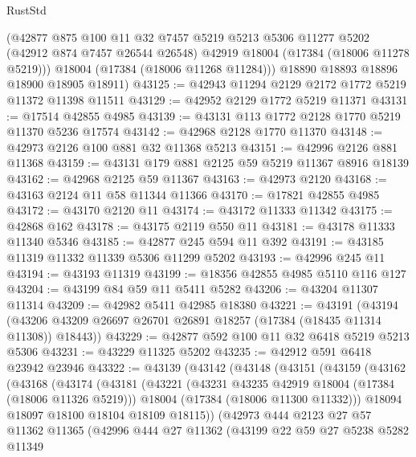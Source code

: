 \begin{lexlean}{RustStd}
\begin{coremodule}
        (@42877
          @875
          @100
          @11
          @32
          @7457
          @5219
          @5213
          @5306
          @11277
          @5202
          (@42912 @874 @7457 @26544 @26548)
          @42919
          @18004
          (@17384 (@18006 @11278 @5219)))
        @18004
        (@17384 (@18006 @11268 @11284)))
      @18890
      @18893
      @18896
      @18900
      @18905
      @18911)
@43125 := @42943 @11294 @2129 @2172 @1772 @5219 @11372 @11398 @11511
@43129 := @42952 @2129 @1772 @5219 @11371
@43131 := @17514 @42855 @4985
@43139 := @43131 @113 @1772 @2128 @1770 @5219 @11370 @5236 @17574
@43142 := @42968 @2128 @1770 @11370
@43148 := @42973 @2126 @100 @881 @32 @11368 @5213
@43151 := @42996 @2126 @881 @11368
@43159 := @43131 @179 @881 @2125 @59 @5219 @11367 @8916 @18139
@43162 := @42968 @2125 @59 @11367
@43163 := @42973 @2120
@43168 := @43163 @2124 @11 @58 @11344 @11366
@43170 := @17821 @42855 @4985
@43172 := @43170 @2120 @11
@43174 := @43172 @11333 @11342
@43175 := @42868 @162
@43178 := @43175 @2119 @550 @11
@43181 := @43178 @11333 @11340 @5346
@43185 := @42877 @245 @594 @11 @392
@43191 := @43185 @11319 @11332 @11339 @5306 @11299 @5202
@43193 := @42996 @245 @11
@43194 := @43193 @11319
@43199 := @18356 @42855 @4985 @5110 @116 @127
@43204 := @43199 @84 @59 @11 @5411 @5282
@43206 := @43204 @11307 @11314
@43209 := @42982 @5411 @42985 @18380
@43221 := @43191
    (@43194 (@43206 @43209 @26697 @26701 @26891 @18257 (@17384 (@18435 @11314 @11308)) @18443))
@43229 := @42877 @592 @100 @11 @32 @6418 @5219 @5213 @5306
@43231 := @43229 @11325 @5202
@43235 := @42912 @591 @6418 @23942 @23946
@43322 := @43139
    (@43142
      (@43148
        (@43151
          (@43159
            (@43162
              (@43168
                (@43174
                  (@43181
                    (@43221
                      (@43231 @43235 @42919 @18004 (@17384 (@18006 @11326 @5219)))
                      @18004
                      (@17384 (@18006 @11300 @11332)))
                    @18094
                    @18097
                    @18100
                    @18104
                    @18109
                    @18115))
                (@42973
                  @444
                  @2123
                  @27
                  @57
                  @11362
                  @11365
                  (@42996
                    @444
                    @27
                    @11362
                    (@43199
                      @22
                      @59
                      @27
                      @5238
                      @5282
                      @11349

\end{coremodule}
\end{lexlean}
